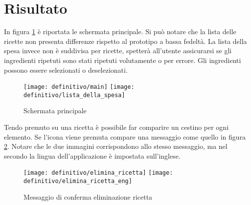 



\section{Risultato}
In figura \ref{fig:def_main} è riportata le schermata principale.
Si può notare che la lista delle ricette non presenta differenze rispetto al prototipo a bassa fedeltà.
La lista della spesa invece non è suddivisa per ricette, spetterà all'utente assicurarsi se gli ingredienti ripetuti sono stati ripetuti volutamente o per errore.
Gli ingredienti possono essere selezionati o deselezionati.

\begin{figure}[ht]
  \begin{center}
    \texttt{[image: definitivo/main]}
    \texttt{[image: definitivo/lista\_della\_spesa]}
    \caption{Schermata principale}
    \label{fig:def_main}
  \end{center}
\end{figure}

Tendo premuto su una ricetta è possibile far comparire un cestino per ogni elemento.
Se l'icona viene premuta compare una messaggio come quello in figura \ref{fig:def_main_3}.
Notare che le due immagini corrispondono allo stesso messaggio, ma nel secondo la lingua dell'applicazione è impostata sull'inglese.

\begin{figure}[ht]
  \begin{center}
    \texttt{[image: definitivo/elimina\_ricetta]}
    \texttt{[image: definitivo/elimina\_ricetta\_eng]}
    \caption{Messaggio di conferma eliminazione ricetta}
    \label{fig:def_main_3}
  \end{center}
\end{figure}

